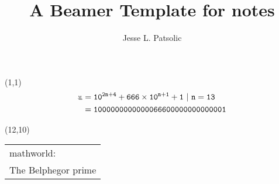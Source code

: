 \documentclass[xcolor=dvipsnames, aspectratio=169]{beamer}
\title[Daily Notes]{A Beamer Template for notes}
\subtitle[]{}
\author[JLP]{Jesse L. Patsolic}
\newcommand\rotpi{\rotatebox[origin=c]{180}{$\mathtt{\pi}$}}
\newcommand\copi{\reflectbox{\rotpi}}
\begin{document}
\begin{frame}[plain]
\begin{textblock}{3}(1,1)
    \hfill
    {\color{black!70}
    \huge{
	\begin{align*}
	    \copi &= \mathtt{10^{2n+4} + 666 \times 10^{n+1} + 1\ |\ n=13}\\
	    &= \mathtt{1000000000000066600000000000001}
	\end{align*}
    }
}
    \hfill
\end{textblock}

\begin{textblock}{3.25}(12,10)
    \hspace{1mm}
	{\color{black!70}
	}\\%
	{\color{black!70}
	{\small
	\begin{tabular}{l}
	mathworld:\\ 
	The Belphegor prime
	\end{tabular}
	}
	}
\end{textblock}
\end{frame}
\end{document}
